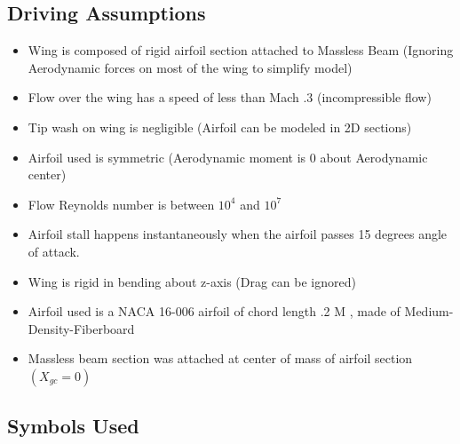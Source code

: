 \documentclass[]{article}
\begin{document}
\subsection{Driving Assumptions}

\begin{itemize}
	
	\item Wing is composed of rigid airfoil section attached to Massless Beam (Ignoring Aerodynamic forces on most of the wing to simplify model)
	
	\item Flow over the wing has a speed of less than Mach .3 (incompressible flow)
	
	\item Tip wash on wing is negligible (Airfoil can be modeled in 2D sections)
	
	\item Airfoil used is symmetric (Aerodynamic moment is 0 about Aerodynamic center)
	
	\item Flow Reynolds number is between $10^4$ and $10^7$
	
	\item Airfoil stall happens instantaneously when the airfoil passes 15 degrees angle of attack. 
	
	\item Wing is rigid in bending about z-axis (Drag can be ignored)
	
	\item Airfoil used is a NACA 16-006 airfoil of chord length .2 M , made of Medium-Density-Fiberboard
	
	\item Massless beam section was attached at center of mass of airfoil section $(X_{gc} = 0)$
	

\end{itemize}


\subsection{Symbols Used}
\end{document}
